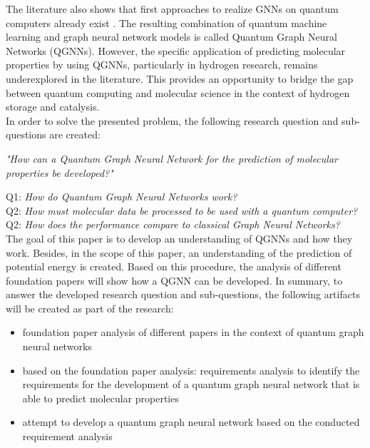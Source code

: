The literature also shows that first approaches to realize GNNs on quantum computers already exist \cite{verdon_quantum_2019, beer_quantum_2021,ai_decompositional_2023,zheng2021quantum,ryu2023quantum}. The resulting combination of quantum machine learning and graph neural network models is called Quantum Graph Neural Networks (QGNNs). However, the specific application of predicting molecular properties by using QGNNs, particularly in hydrogen research, remains underexplored in the literature. This provides an opportunity to bridge the gap between quantum computing and molecular science in the context of hydrogen storage and catalysis. \\
    
In order to solve the presented problem, the following research question and sub-questions are created: 

\begin{center}
    \textit{"How can a Quantum Graph Neural Network for the prediction of molecular properties be developed?"} \\
\end{center}
Q1: \textit{How do Quantum Graph Neural Networks work?} \\
Q2: \textit{How must molecular data be processed to be used with a quantum computer?} \\
Q2: \textit{How does the performance compare to classical Graph Neural Networks?} \\

The goal of this paper is to develop an understanding of QGNNs and how they work. Besides, in the scope of this paper, an understanding of the prediction of potential energy is created. Based on this procedure, the analysis of different foundation papers will show how a QGNN can be developed. In summary, to answer the developed research question and sub-questions, the following artifacts will be created as part of the research: 

\begin{itemize}
    \item foundation paper analysis of different papers in the context of quantum graph neural networks
    \item based on the foundation paper analysis: requirements analysis to identify the requirements for the development of a quantum graph neural network that is able to predict molecular properties 
    \item attempt to develop a quantum graph neural network based on the conducted requirement analysis
\end{itemize}  

